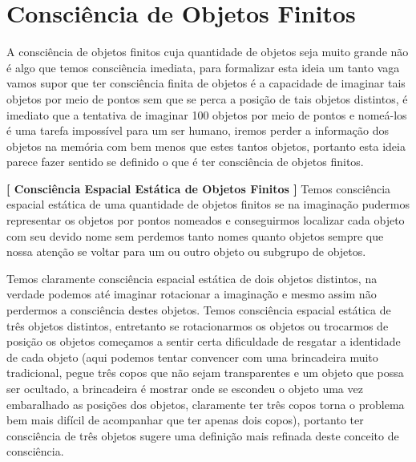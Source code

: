 \documentclass[10pt,a4paper]{report}
\begin{document}
\section{Consciência de Objetos Finitos}

\hspace{\baselineskip}

A consciência de objetos finitos cuja quantidade de objetos seja muito grande não é algo que temos consciência imediata, para formalizar esta ideia um tanto vaga vamos supor que ter consciência finita de objetos é a capacidade de imaginar tais objetos por meio de pontos sem que se perca a posição de tais objetos distintos, é imediato que a tentativa de imaginar 100 objetos por meio de pontos e nomeá-los é uma tarefa impossível para um ser humano, iremos perder a informação dos objetos na memória com bem menos que estes tantos objetos, portanto esta ideia parece fazer sentido se definido o que é ter consciência de objetos finitos.

\hspace{\baselineskip}

\textbf{[ Consciência Espacial Estática de Objetos Finitos ]} Temos consciência espacial estática de uma quantidade de objetos finitos se na imaginação pudermos representar os objetos por pontos nomeados e conseguirmos localizar cada objeto com seu devido nome sem perdemos tanto nomes quanto objetos sempre que nossa atenção se voltar para um ou outro objeto ou subgrupo de objetos.

\hspace{\baselineskip}

Temos claramente consciência espacial estática de dois objetos distintos, na verdade podemos até imaginar rotacionar a imaginação e mesmo assim não perdermos a consciência destes objetos. Temos consciência espacial estática de três objetos distintos, entretanto se rotacionarmos os objetos ou trocarmos de posição os objetos começamos a sentir certa dificuldade de resgatar a identidade de cada objeto (aqui podemos tentar convencer com uma brincadeira muito tradicional, pegue três copos que não sejam transparentes e um objeto que possa ser ocultado, a brincadeira é mostrar onde se escondeu o objeto uma vez embaralhado as posições dos objetos, claramente ter três copos torna o problema bem mais difícil de acompanhar que ter apenas dois copos), portanto ter consciência de três objetos sugere uma definição mais refinada deste conceito de consciência. 
\end{document}
